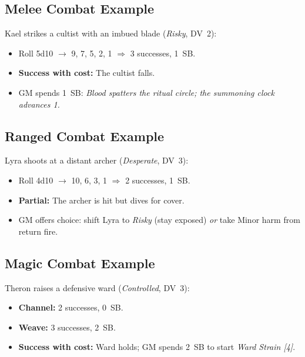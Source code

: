 \subsection{Melee Combat Example}
\label{subsec:melee-example}

Kael strikes a cultist with an imbued blade (\textit{Risky}, DV~2):
\begin{itemize}
  \item Roll 5d10 $\rightarrow$ 9, 7, 5, 2, 1 $\Rightarrow$ 3 successes, 1~SB.
  \item \textbf{Success with cost:} The cultist falls.
  \item GM spends 1~SB: \emph{Blood spatters the ritual circle; the summoning clock advances 1.}
\end{itemize}

\subsection{Ranged Combat Example}
\label{subsec:ranged-example}

Lyra shoots at a distant archer (\textit{Desperate}, DV~3):
\begin{itemize}
  \item Roll 4d10 $\rightarrow$ 10, 6, 3, 1 $\Rightarrow$ 2 successes, 1~SB.
  \item \textbf{Partial:} The archer is hit but dives for cover.
  \item GM offers choice: shift Lyra to \textit{Risky} (stay exposed) \emph{or} take Minor harm from return fire.
\end{itemize}

\subsection{Magic Combat Example}
\label{subsec:magic-example}

Theron raises a defensive ward (\textit{Controlled}, DV~3):
\begin{itemize}
  \item \textbf{Channel:} 2 successes, 0~SB.
  \item \textbf{Weave:} 3 successes, 2~SB.
  \item \textbf{Success with cost:} Ward holds; GM spends 2~SB to start \emph{Ward Strain [4]}.
\end{itemize}

